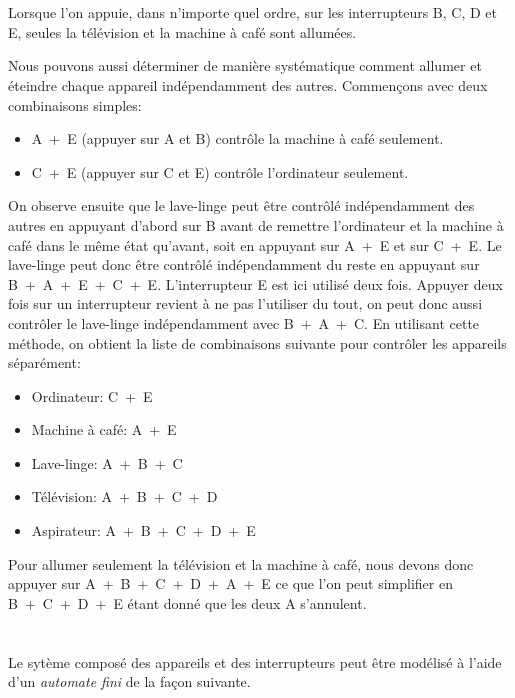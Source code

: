 {{%
\section*{\BrochureSolution}
Lorsque l’on appuie, dans n’importe quel ordre, sur les interrupteurs B, C, D et E, seules la télévision et la machine à café sont allumées.

Nous pouvons aussi déterminer de manière systématique comment allumer et éteindre chaque appareil indépendamment des autres. Commençons avec deux combinaisons simples:

\begin{itemize}
  \item A~+~E (appuyer sur A et B) contrôle la machine à café seulement.
  \item C~+~E (appuyer sur C et E) contrôle l’ordinateur seulement.
\end{itemize}

On observe ensuite que le lave-linge peut être contrôlé indépendamment des autres en appuyant d’abord sur B avant de remettre l’ordinateur et la machine à café dans le même état qu’avant, soit en appuyant sur A~+~E et sur C~+~E. Le lave-linge peut donc être contrôlé indépendamment du reste en appuyant sur B~+~A~+~E~+~C~+~E. L’interrupteur E est ici utilisé deux fois. Appuyer deux fois sur un interrupteur revient à ne pas l’utiliser du tout, on peut donc aussi contrôler le lave-linge indépendamment avec B~+~A~+~C. En utilisant cette méthode, on obtient la liste de combinaisons suivante pour contrôler les appareils séparément:

\begin{itemize}
  \item Ordinateur: C~+~E
  \item Machine à café: A~+~E
  \item Lave-linge: A~+~B~+~C
  \item Télévision: A~+~B~+~C~+~D
  \item Aspirateur: A~+~B~+~C~+~D~+~E
\end{itemize}

Pour allumer seulement la télévision et la machine à café, nous devons donc appuyer sur A~+~B~+~C~+~D~+~A~+~E ce que l’on peut simplifier en B~+~C~+~D~+~E étant donné que les deux A s’annulent.



\section*{\BrochureItsInformatics}
Le sytème composé des appareils et des interrupteurs peut être modélisé à l’aide d’un \emph{automate fini} de la façon suivante.

}}
